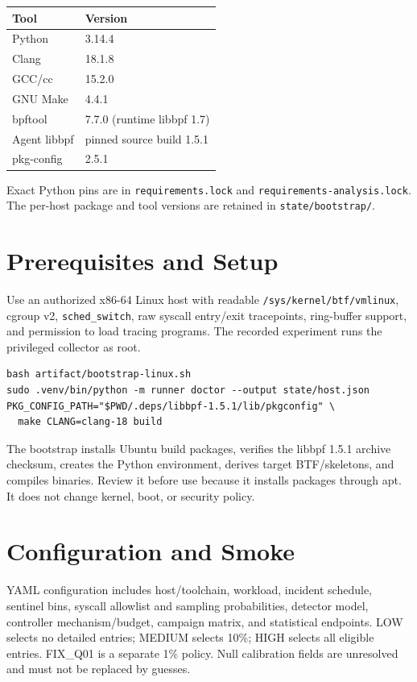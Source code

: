 \documentclass[10pt]{article}
\begin{document}
\begin{tabular}{@{}ll@{}}
\toprule
Tool & Version\\
\midrule
Python & 3.14.4\\
Clang & 18.1.8\\
GCC/cc & 15.2.0\\
GNU Make & 4.4.1\\
bpftool & 7.7.0 (runtime libbpf 1.7)\\
Agent libbpf & pinned source build 1.5.1\\
pkg-config & 2.5.1\\
\bottomrule
\end{tabular}

Exact Python pins are in \texttt{requirements.lock} and \texttt{requirements-analysis.lock}. The per-host package and tool versions are retained in \texttt{state/bootstrap/}.

\section{Prerequisites and Setup}
Use an authorized x86-64 Linux host with readable \texttt{/sys/kernel/btf/vmlinux}, cgroup v2, \texttt{sched\_switch}, raw syscall entry/exit tracepoints, ring-buffer support, and permission to load tracing programs. The recorded experiment runs the privileged collector as root.

\begin{lstlisting}
bash artifact/bootstrap-linux.sh
sudo .venv/bin/python -m runner doctor --output state/host.json
PKG_CONFIG_PATH="$PWD/.deps/libbpf-1.5.1/lib/pkgconfig" \
  make CLANG=clang-18 build
\end{lstlisting}

The bootstrap installs Ubuntu build packages, verifies the libbpf 1.5.1 archive checksum, creates the Python environment, derives target BTF/skeletons, and compiles binaries. Review it before use because it installs packages through apt. It does not change kernel, boot, or security policy.

\section{Configuration and Smoke}
YAML configuration includes host/toolchain, workload, incident schedule, sentinel bins, syscall allowlist and sampling probabilities, detector model, controller mechanism/budget, campaign matrix, and statistical endpoints. LOW selects no detailed entries; MEDIUM selects 10\%; HIGH selects all eligible entries. FIX\_Q01 is a separate 1\% policy. Null calibration fields are unresolved and must not be replaced by guesses.
\end{document}
